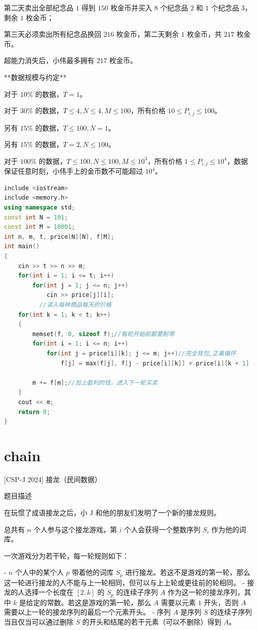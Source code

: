 \documentclass[12pt,twiside,a4paper]{ctexbook}
\numberwithin{chapter}{part}
\begin{document}
第二天卖出全部纪念品 $1$ 得到 $150$ 枚金币并买入 $8$ 个纪念品 $2$ 和 $1$ 个纪念品 $3$，剩余 $1$ 枚金币；

第三天必须卖出所有纪念品换回 $216$ 枚金币，第二天剩余 $1$ 枚金币，共 $217$ 枚金币。

超能力消失后，小伟最多拥有 $217$ 枚金币。


**数据规模与约定**

对于 $10\%$ 的数据，$T = 1$。

对于 $30\%$ 的数据，$T \leq 4, N \leq 4, M \leq 100$，所有价格 $10 \leq P_{i,j} \leq 100$。

另有 $15\%$ 的数据，$T \leq 100, N = 1$。

另有 $15\%$ 的数据，$T = 2, N \leq 100$。

对于 $100\%$ 的数据，$T \leq 100, N \leq 100, M \leq 10^3$，所有价格 $1 \leq P_{i,j} \leq 10^4$，数据保证任意时刻，小伟手上的金币数不可能超过 $10^4$。
\begin{lstlisting}[language=c++,breaklines=true]
include <iostream>
include <memory.h>
using namespace std;
const int N = 101;
const int M = 10001;
int n, m, t, price[N][N], f[M];
int main()
{
	cin >> t >> n >> m;
	for(int i = 1; i <= t; i++)
		for(int j = 1; j <= n; j++)
			cin >> price[j][i];
          //读入每种商品每天的价格
	for(int k = 1; k < t; k++)
	{
		memset(f, 0, sizeof f);//每轮开始前都要制零
		for(int i = 1; i <= n; i++)
			for(int j = price[i][k]; j <= m; j++)//完全背包,正着循环
				f[j] = max(f[j], f[j - price[i][k]] + price[i][k + 1] - price[i][k]);
      
		m += f[m];//加上盈利的钱，进入下一轮买卖
	}
	cout << m;
	return 0;
}
\end{lstlisting}

\section{chain}
 [CSP-J 2024] 接龙（民间数据）

 题目描述

在玩惯了成语接龙之后，小 J 和他的朋友们发明了一个新的接龙规则。

总共有 $n$ 个人参与这个接龙游戏，第 $i$ 个人会获得一个整数序列 $S_i$ 作为他的词库。

一次游戏分为若干轮，每一轮规则如下：

- $n$ 个人中的某个人 $p$ 带着他的词库 $S_p$ 进行接龙。若这不是游戏的第一轮，那么这一轮进行接龙的人不能与上一轮相同，但可以与上上轮或更往前的轮相同。
- 接龙的人选择一个长度在 $[2, k]$ 的 $S_p$ 的连续子序列 $A$ 作为这一轮的接龙序列，其中 $k$ 是给定的常数。若这是游戏的第一轮，那么 $A$ 需要以元素 $1$ 开头，否则 $A$ 需要以上一轮的接龙序列的最后一个元素开头。
  - 序列 $A$ 是序列 $S$ 的连续子序列当且仅当可以通过删除 $S$ 的开头和结尾的若干元素（可以不删除）得到 $A$。
\end{document}
